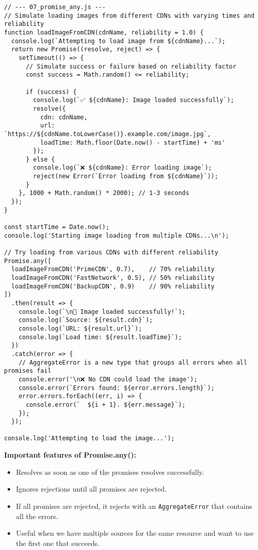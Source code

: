 \documentclass[12pt,letterpaper]{article}
\newenvironment{macterminal}{%
    \begin{mdframed}[
        linecolor=terminalFrame,
        backgroundcolor=terminalBg,
        roundcorner=5pt,
        skipabove=5pt,
        skipbelow=5pt,
        linewidth=1pt,
        innertopmargin=5pt,
        frametitle={%
            \tikz[baseline=(current bounding box.east), outer sep=0pt]{
                \fill[red!80!black] (0,0) circle (5pt);
                \fill[yellow!80!black] (0.7,0) circle (5pt);
                \fill[green!70!black] (1.4,0) circle (5pt);
            }
        },
        frametitlealignment=\raggedright,
        frametitleaboveskip=8pt,
        frametitlebelowskip=0pt,
    ]
}{%
    \end{mdframed}%
}
\begin{document}
\begin{macterminal}
\begin{lstlisting}
// --- 07_promise_any.js ---
// Simulate loading images from different CDNs with varying times and reliability
function loadImageFromCDN(cdnName, reliability = 1.0) {
  console.log(`Attempting to load image from ${cdnName}...`);
  return new Promise((resolve, reject) => {
    setTimeout(() => {
      // Simulate success or failure based on reliability factor
      const success = Math.random() <= reliability;
      
      if (success) {
        console.log(`✅ ${cdnName}: Image loaded successfully`);
        resolve({
          cdn: cdnName,
          url: `https://${cdnName.toLowerCase()}.example.com/image.jpg`,
          loadTime: Math.floor(Date.now() - startTime) + 'ms'
        });
      } else {
        console.log(`❌ ${cdnName}: Error loading image`);
        reject(new Error(`Error loading from ${cdnName}`));
      }
    }, 1000 + Math.random() * 2000); // 1-3 seconds
  });
}

const startTime = Date.now();
console.log('Starting image loading from multiple CDNs...\n');

// Try loading from various CDNs with different reliability
Promise.any([
  loadImageFromCDN('PrimeCDN', 0.7),    // 70% reliability
  loadImageFromCDN('FastNetwork', 0.5), // 50% reliability
  loadImageFromCDN('BackupCDN', 0.9)    // 90% reliability
])
  .then(result => {
    console.log(`\n📸 Image loaded successfully!`);
    console.log(`Source: ${result.cdn}`);
    console.log(`URL: ${result.url}`);
    console.log(`Load time: ${result.loadTime}`);
  })
  .catch(error => {
    // AggregateError is a new type that groups all errors when all promises fail
    console.error('\n❌ No CDN could load the image');
    console.error(`Errors found: ${error.errors.length}`);
    error.errors.forEach((err, i) => {
      console.error(`  ${i + 1}. ${err.message}`);
    });
  });

console.log('Attempting to load the image...');
\end{lstlisting}
\end{macterminal}

\textbf{Important features of Promise.any():}
\begin{itemize}
    \item Resolves as soon as one of the promises resolves successfully.
    \item Ignores rejections until all promises are rejected.
    \item If all promises are rejected, it rejects with an \texttt{\textcolor{accentColor}{AggregateError}} that contains all the errors.
    \item Useful when we have multiple sources for the same resource and want to use the first one that succeeds.
\end{itemize}
\end{document}
